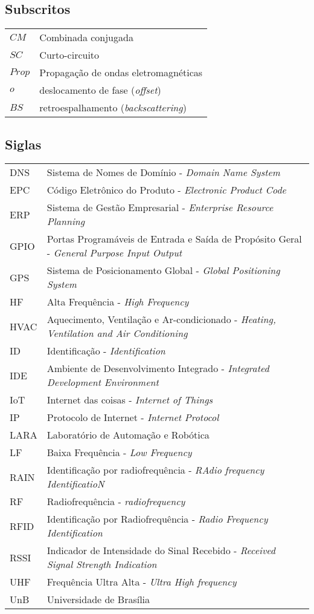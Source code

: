 \subsection*{Subscritos}

\begin{tabular}{p{}p{}}
$CM$  & Combinada conjugada \tabularnewline
$SC$  & Curto-circuito \tabularnewline
$Prop$  & Propagação de ondas eletromagnéticas \tabularnewline
$o$  & deslocamento de fase (\textit{offset})\tabularnewline
$BS$ & retroespalhamento (\textit{backscattering}) \tabularnewline
\end{tabular}





\subsection*{Siglas}

\begin{tabular}{p{}p{}}
DNS & Sistema de Nomes de Domínio -  \textit{Domain Name System} \tabularnewline
EPC  & Código Eletrônico do Produto - \textit{Electronic Product Code}\tabularnewline
ERP & Sistema de Gestão Empresarial - \textit{Enterprise Resource Planning} \tabularnewline
GPIO & Portas Programáveis de Entrada e Saída de Propósito Geral - \textit{General Purpose Input Output} \tabularnewline
GPS & Sistema de Posicionamento Global - \textit{Global Positioning System} \tabularnewline
HF & Alta Frequência - \textit{High Frequency} \tabularnewline
HVAC & Aquecimento, Ventilação e Ar-condicionado - \textit{Heating, Ventilation and Air Conditioning}\tabularnewline
ID & Identificação - \textit{Identification} \tabularnewline
IDE & Ambiente de Desenvolvimento Integrado - \textit{Integrated Development Environment} \tabularnewline
IoT & Internet das coisas - \textit{Internet of Things} \tabularnewline
IP & Protocolo de Internet - \textit{Internet Protocol} \tabularnewline
LARA & Laboratório de Automação e Robótica \tabularnewline
LF & Baixa Frequência - \textit{Low Frequency} \tabularnewline
RAIN & Identificação por radiofrequência - \textit{RAdio frequency IdentificatioN} \tabularnewline
RF & Radiofrequência - \textit{radiofrequency} \tabularnewline
RFID & Identificação por Radiofrequência - \textit{Radio Frequency Identification}\tabularnewline
RSSI &  Indicador de Intensidade do Sinal Recebido - \textit{Received Signal Strength Indication} \tabularnewline
UHF & Frequência Ultra Alta - \textit{Ultra High frequency} \tabularnewline
UnB & Universidade de Brasília \tabularnewline
\end{tabular}
